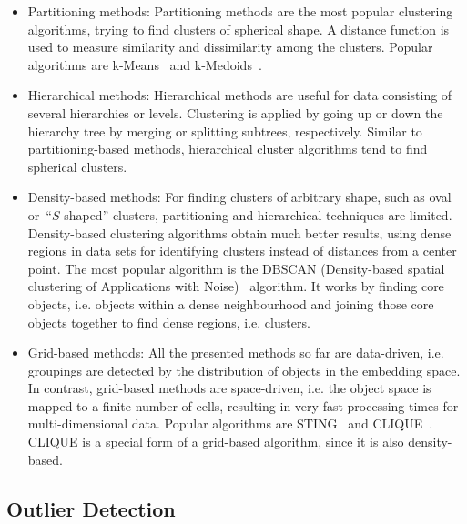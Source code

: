 \begin{itemize} 
\item Partitioning methods: Partitioning methods are the most popular clustering algorithms, trying to find clusters of spherical shape. A distance function is used to measure similarity and dissimilarity among the clusters. Popular algorithms are k-Means~\parencite{Lloyd82} and k-Medoids~\parencite{medoid}. 
\item Hierarchical methods: Hierarchical methods are useful for data consisting of several hierarchies or levels. Clustering is applied by going up or down the hierarchy tree by merging or splitting subtrees, respectively. Similar to partitioning-based methods, hierarchical cluster algorithms tend to find spherical clusters. 
\item Density-based methods: For finding clusters of arbitrary shape, such as oval or~\enquote{$S$-shaped} clusters, partitioning and hierarchical techniques are limited. Density-based clustering algorithms obtain much better results, using dense regions in data sets for identifying clusters instead of distances from a center point. The most popular algorithm is the DBSCAN (Density-based spatial clustering of Applications with Noise)~\parencite{dbscan} algorithm. It works by finding core objects, i.e. objects within a dense neighbourhood and joining those core objects together to find dense regions, i.e. clusters.
\item Grid-based methods: All the presented methods so far are data-driven, i.e. groupings are detected by the distribution of objects in the embedding space. In contrast, grid-based methods are space-driven, i.e. the object space is mapped to a finite number of cells, resulting in very fast processing times for multi-dimensional data. Popular algorithms are STING~\parencite{sting} and CLIQUE~\parencite{clique}. CLIQUE is a special form of a grid-based algorithm, since it is also density-based.
\end{itemize}





\subsection{Outlier Detection}

